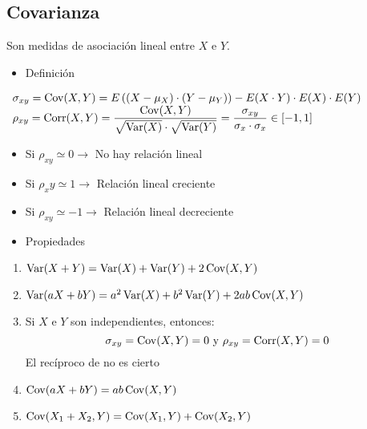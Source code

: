 \begin{enumerate}[label=\color{red}\textbf{\Alph*)},leftmargin=*]
\subsection{Covarianza}
Son medidas de asociación lineal entre $X$ e $Y$.
\begin{itemize}[label=\color{red}\textbullet, leftmargin=*]
	\item \color{lightblue}Definición
\end{itemize}
$\begin{array}{l}
	\sigma_{xy}=\operatorname{Cov}(X,Y)=E\left((X-\mu_X)\cdot(Y-\mu_Y)\right)-E(X\cdot Y)\cdot E(X)\cdot E(Y)\\
	\rho_{xy}=\mathrm{Corr}(X,Y)=\dfrac{\operatorname{Cov}(X,Y)}{\sqrt{\operatorname{Var}(X)}\cdot\sqrt{\operatorname{Var}(Y)}}=\dfrac{\sigma_{xy}}{\sigma_x\cdot\sigma_x}\in[-1,1]
\end{array}$
\begin{itemize}
	\item Si $\rho_{xy}\simeq0\longrightarrow$ No hay relación lineal
	\item Si $\rho_xy\simeq1\longrightarrow$ Relación lineal creciente
	\item Si $\rho_{xy}\simeq-1\longrightarrow$ Relación lineal decreciente
\end{itemize}
\begin{itemize}[label=\color{red}\textbullet, leftmargin=*]
	\item \color{lightblue}Propiedades
\end{itemize}
\begin{enumerate}[label=\color{lightblue}\arabic*)]
	\item $\operatorname{Var}(X+Y)=\operatorname{Var}(X)+\operatorname{Var}(Y)+2\operatorname{Cov}(X,Y)$
	\item $\operatorname{Var}(aX+bY)=a^2\operatorname{Var}(X)+b^2\operatorname{Var}(Y)+2ab\operatorname{Cov}(X,Y)$
	\item Si $X$ e $Y$ son independientes, entonces: \[ \sigma_{xy}=\operatorname{Cov}(X,Y)=0\text{ y }\rho_{xy}=\mathrm{Corr}(X,Y)=0 \]El recíproco de  no es cierto
	\item $\operatorname{Cov}(aX+bY)=ab\operatorname{Cov}(X,Y)$
	\item $\operatorname{Cov}(X_1+X_2,Y)=\operatorname{Cov}(X_1,Y)+\operatorname{Cov}(X_2,Y)$
\end{enumerate}
\end{enumerate}
